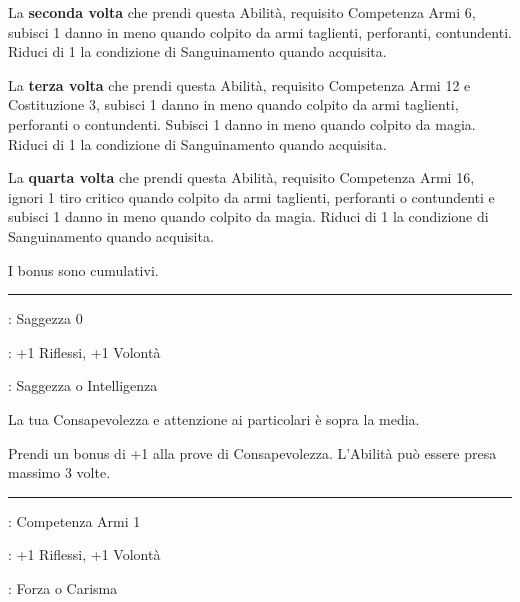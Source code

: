 \begin{multicols}{2}
La \textbf{seconda volta} che prendi questa Abilità, requisito Competenza Armi 6, subisci 1 danno in meno quando colpito da armi taglienti, perforanti, contundenti. Riduci di 1 la condizione di Sanguinamento quando acquisita.

La \textbf{terza volta} che prendi questa Abilità, requisito Competenza Armi 12 e Costituzione 3, subisci 1 danno in meno quando colpito da armi taglienti, perforanti o contundenti. Subisci 1 danno in meno quando colpito da magia. Riduci di 1 la condizione di Sanguinamento quando acquisita.

La \textbf{quarta volta} che prendi questa Abilità, requisito Competenza Armi 16, ignori 1 tiro critico quando colpito da armi taglienti, perforanti o contundenti e subisci 1 danno in meno quando colpito da magia. Riduci di 1 la condizione di Sanguinamento quando acquisita.

I bonus sono cumulativi.

\smallskip\noindent\rule{\linewidth}{2pt} \hypertarget{Percettivo}{}\medskip{}\label{Percettivo}
\noindent
\begin{description}[noitemsep, topsep=0pt, parsep=0pt, partopsep=0pt, leftmargin=0cm, labelwidth=2.5cm]
    \item[\textbf{Requisito}]: Saggezza 0
    \item[\textbf{Tiri Salvezza}]: +1 Riflessi, +1 Volontà
    \item[\textbf{Caratteristica}]: Saggezza o Intelligenza
\end{description}

La tua Consapevolezza e attenzione ai particolari è sopra la media.

Prendi un bonus di +1 alla prove di Consapevolezza. L'Abilità può essere presa massimo 3 volte.

\smallskip\noindent\rule{\linewidth}{2pt} \hypertarget{Persona veramente malvagia}{}\medskip{}
\noindent
\begin{description}[noitemsep, topsep=0pt, parsep=0pt, partopsep=0pt, leftmargin=0cm, labelwidth=2.5cm]
    \item[\textbf{Requisito}]: Competenza Armi 1
    \item[\textbf{Tiri Salvezza}]: +1 Riflessi, +1 Volontà
    \item[\textbf{Caratteristica}]: Forza o Carisma
\end{description}


\end{multicols}
